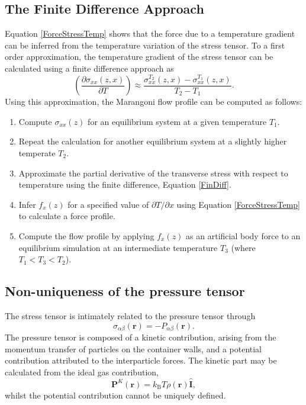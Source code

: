 \subsection{The Finite Difference Approach}
Equation \ref{ForceStressTemp} shows that the force due to a temperature gradient can be inferred from the temperature variation of the stress tensor. 
To a first order approximation, the temperature gradient of the stress tensor can be calculated using a finite difference approach as
\begin{equation}
\label{FinDiff}
\left( \frac{\partial \sigma_{xx}(z,x)}{\partial T} \right) \approx \frac{\sigma_{xx}^{T_{2}}(z,x) - \sigma_{xx}^{T_{1}}(z,x)}{T_{2} - T_{1}}.
\end{equation}
Using this approximation, the Marangoni flow profile can be computed as follows:
\begin{enumerate}
	\item Compute $\sigma_{xx}(z)$ for an equilibrium system at a given temperature $T_{1}$.
	\item Repeat the calculation for another equilibrium system at a slightly higher temperate $T_{2}$.
	\item Approximate the partial derivative of the transverse stress with respect to temperature using the finite difference, Equation \ref{FinDiff}.
	\item Infer $f_{x}(z)$ for a specified value of $\partial T / \partial x$ using Equation \ref{ForceStressTemp} to calculate a force profile.
	\item Compute the flow profile by applying $f_{x}(z)$ as an artificial body force to an equilibrium simulation at an intermediate temperature $T_{3}$ (where $T_{1} < T_{3} < T_{2}$).
\end{enumerate}

\subsection{Non-uniqueness of the pressure tensor}
The stress tensor is intimately related to the pressure tensor through
\begin{equation}
\sigma_{\alpha \beta}(\mathbf{r}) = - P_{\alpha \beta} (\mathbf{r}).
\end{equation}
The pressure tensor is composed of a kinetic contribution, arising from the momentum transfer of particles on the container walls, and a potential contribution attributed to the interparticle forces.\cite{VarnikBinder}
The kinetic part may be calculated from the ideal gas contribution,
\begin{equation}
\mathbf{P}^{K}(\mathbf{r})=k_{\mathrm{B}} T \rho(\mathbf{r}) \hat{\mathbf{I}},
\end{equation}
whilst the potential contribution cannot be uniquely defined.

